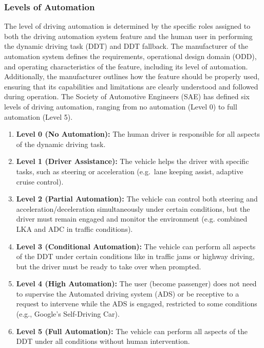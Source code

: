 \subsubsection{Levels of Automation}\label{subsubsec:levels-of-automation}
The level of driving automation is determined by the specific roles assigned to both the driving automation system feature and the human user in performing the dynamic driving task (DDT) and DDT fallback\cite{sae_j3016_2021}.
The manufacturer of the automation system defines the requirements, operational design domain (ODD), and operating characteristics of the feature, including its level of automation.
Additionally, the manufacturer outlines how the feature should be properly used, ensuring that its capabilities and limitations are clearly understood and followed during operation.
The Society of Automotive Engineers (SAE) has defined six levels of driving automation, ranging from no automation (Level 0) to full automation (Level 5)\cite{sae_j3016_2021}.

\begin{enumerate}
    \item \textbf{Level 0 (No Automation):} The human driver is responsible for all aspects of the dynamic driving task.
    \item \textbf{Level 1 (Driver Assistance):} The vehicle helps the driver with specific tasks, such as steering or acceleration (e.g.\ lane keeping assist, adaptive cruise control).
    \item \textbf{Level 2 (Partial Automation):} The vehicle can control both steering and acceleration/deceleration simultaneously under certain conditions, but the driver must remain engaged and monitor the environment (e.g. combined LKA and ADC in traffic conditions).
    \item \textbf{Level 3 (Conditional Automation):} The vehicle can perform all aspects of the DDT under certain conditions like in traffic jams or highway driving, but the driver must be ready to take over when prompted.
    \item \textbf{Level 4 (High Automation):} The user (become passenger) does not need to supervise the Automated driving system (ADS) or be receptive to a request to intervene while the
    ADS is engaged, restricted to some conditions (e.g., Google's Self-Driving Car\cite{teoh2017rage}).
    \item \textbf{Level 5 (Full Automation):} The vehicle can perform all aspects of the DDT under all conditions without human intervention.
\end{enumerate}

